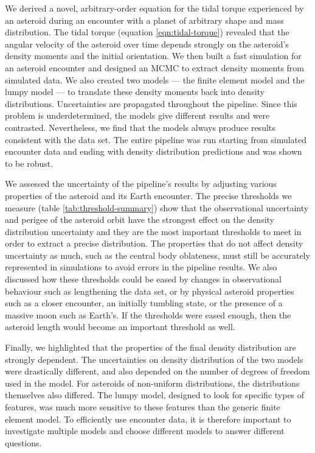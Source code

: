 \documentclass[fleqn,usenatbib]{mnras}
\begin{document}
We derived a novel, arbitrary-order equation for the tidal torque experienced by an asteroid during an encounter with a planet of arbitrary shape and mass distribution. The tidal torque (equation \ref{eqn:tidal-torque}) revealed that the angular velocity of the asteroid over time depends strongly on the asteroid's density moments and the initial orientation. We then built a fast simulation for an asteroid encounter and designed an MCMC to extract density moments from simulated data. We also created two models --- the finite element model and the lumpy model --- to translate these density moments back into density distributions. Uncertainties are propagated throughout the pipeline. Since this problem is underdetermined, the models give different results and were contrasted. Nevertheless, we find that the models always produce results consistent with the data set. The entire pipeline was run starting from simulated encounter data and ending with density distribution predictions and was shown to be robust.

We assessed the uncertainty of the pipeline's results by adjusting various properties of the asteroid and its Earth encounter. The precise thresholds we measure (table \ref{tab:threshold-summary}) show that the observational uncertainty and perigee of the asteroid orbit have the strongest effect on the density distribution uncertainty and they are the most important thresholds to meet in order to extract a precise distribution. The properties that do not affect density uncertainty as much, such as the central body oblateness, must still be accurately represented in simulations to avoid errors in the pipeline results. We also discussed how these thresholds could be eased by changes in observational behaviour such as lengthening the data set, or by physical asteroid properties such as a closer encounter, an initially tumbling state, or the presence of a massive moon such as Earth's. If the thresholds were eased enough, then the asteroid length would become an important threshold as well.

Finally, we highlighted that the properties of the final density distribution are strongly dependent. The uncertainties on density distribution of the two models were drastically different, and also depended on the number of degrees of freedom used in the model. For asteroids of non-uniform distributions, the distributions themselves also differed. The lumpy model, designed to look for specific types of features, was much more sensitive to these features than the generic finite element model. To efficiently use encounter data, it is therefore important to investigate multiple models and choose different models to answer different questions.
\end{document}
